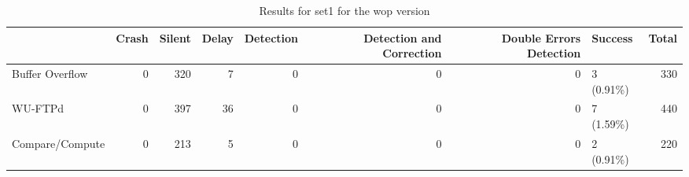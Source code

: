 \begin{table}[t]
	\centering
	\caption{Results for set1 for the wop version}
	\label{table:end_sim_by_status_wop_1_set1}
	\begin{tabular}{lrrrrrrlr}
		\toprule
		                & Crash & Silent & Delay & Detection & Detection and Correction & Double Errors Detection & Success    & Total \\
		\midrule
		Buffer Overflow & 0     & 320    & 7     & 0         & 0                        & 0                       & 3 (0.91\%) & 330   \\
		WU-FTPd         & 0     & 397    & 36    & 0         & 0                        & 0                       & 7 (1.59\%) & 440   \\
		Compare/Compute & 0     & 213    & 5     & 0         & 0                        & 0                       & 2 (0.91\%) & 220   \\
		\bottomrule
	\end{tabular}
\end{table}
